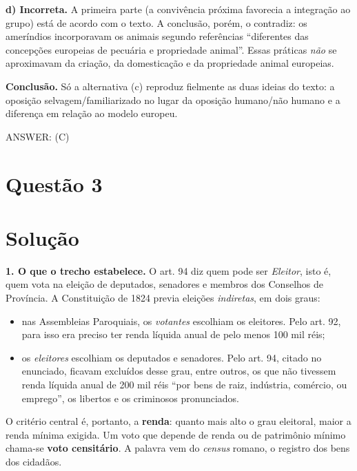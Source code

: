 \documentclass{article}%
\begin{document}
\textbf{d) Incorreta.} A primeira parte (a convivência próxima favorecia a integração ao grupo) está de acordo com o texto. A conclusão, porém, o contradiz: os ameríndios incorporavam os animais segundo referências ``diferentes das concepções europeias de pecuária e propriedade animal''. Essas práticas \emph{não} se aproximavam da criação, da domesticação e da propriedade animal europeias.

\textbf{Conclusão.} Só a alternativa (c) reproduz fielmente as duas ideias do texto: a oposição selvagem/familiarizado no lugar da oposição humano/não humano e a diferença em relação ao modelo europeu.

ANSWER: (C)%
\newpage%
\section*{Questão 3}

\section*{Solução}

\textbf{1. O que o trecho estabelece.} O art. 94 diz quem pode ser \emph{Eleitor}, isto é, quem vota na eleição de deputados, senadores e membros dos Conselhos de Província. A Constituição de 1824 previa eleições \emph{indiretas}, em dois graus:
\begin{itemize}
\item nas Assembleias Paroquiais, os \emph{votantes} escolhiam os eleitores. Pelo art. 92, para isso era preciso ter renda líquida anual de pelo menos 100 mil réis;
\item os \emph{eleitores} escolhiam os deputados e senadores. Pelo art. 94, citado no enunciado, ficavam excluídos desse grau, entre outros, os que não tivessem renda líquida anual de 200 mil réis ``por bens de raiz, indústria, comércio, ou emprego'', os libertos e os criminosos pronunciados.
\end{itemize}
O critério central é, portanto, a \textbf{renda}: quanto mais alto o grau eleitoral, maior a renda mínima exigida. Um voto que depende de renda ou de patrimônio mínimo chama-se \textbf{voto censitário}. A palavra vem do \emph{census} romano, o registro dos bens dos cidadãos.
\end{document}
